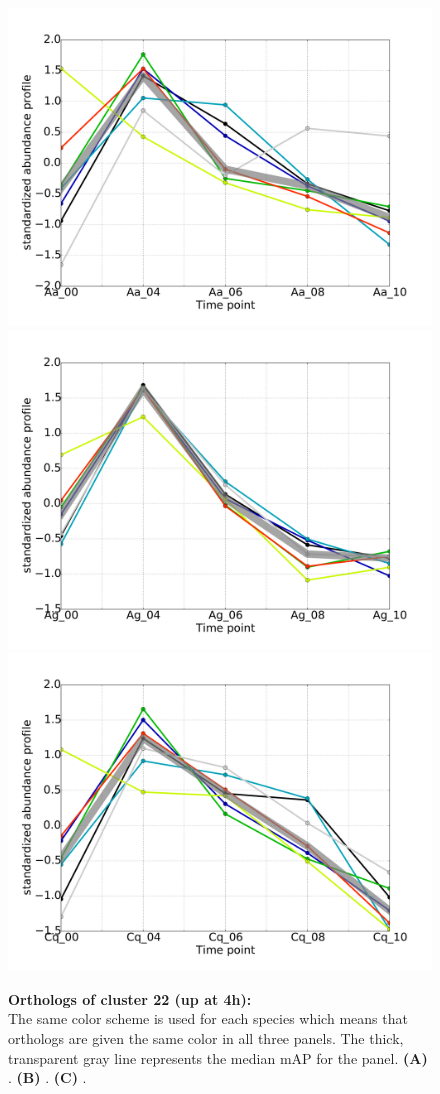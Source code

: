 \begin{figure}[p]
% 
\subcaptionbox{\label{fig:cluster22-Aa}}
{\includegraphics[width=.5\linewidth]{figures/figs/ecr_and_insects_ptci_20130918_orthodb7/upAt4_gene_profiles_from_cummerbund/Aa_upAt4_cls22_Ag_target_FPKMs_vb_orthos.pdf}}
%
\subcaptionbox{\label{fig:cluster22-Ag}}
{\includegraphics[width=.5\linewidth]{figures/figs/ecr_and_insects_ptci_20130918_orthodb7/upAt4_gene_profiles_from_cummerbund/Ag_upAt4_cls22_Ag_target_FPKMs_vb_orthos.pdf}}
%
\subcaptionbox{\label{fig:cluster22-Cq}}
{\includegraphics[width=.5\linewidth]{figures/figs/ecr_and_insects_ptci_20130918_orthodb7/upAt4_gene_profiles_from_cummerbund/Cq_upAt4_cls22_Ag_target_FPKMs_vb_orthos.pdf}}
% 
\caption[Orthologs of cluster 22]{\sf \textbf{Orthologs of cluster 22 (up at 4h):}\\
The same color scheme is used for each species which means that orthologs are given the same color in all three panels.
The thick, transparent gray line represents the median \gls{mAP} for the panel.
\textbf{(A)} \Aa.
\textbf{(B)} \Ag.
\textbf{(C)} \Cq.
}\label{fig:cluster22}
\end{figure}